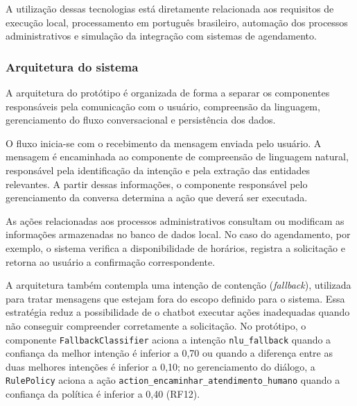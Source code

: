 \documentclass[12pt,a4paper]{extarticle}
\begin{document}
A utilização dessas tecnologias está diretamente relacionada aos requisitos de execução local, processamento em português brasileiro, automação dos processos administrativos e simulação da integração com sistemas de agendamento.

\subsubsection{Arquitetura do sistema}
\label{sec:arquitetura}

A arquitetura do protótipo é organizada de forma a separar os componentes responsáveis pela comunicação com o usuário, compreensão da linguagem, gerenciamento do fluxo conversacional e persistência dos dados.

O fluxo inicia-se com o recebimento da mensagem enviada pelo usuário. A mensagem é encaminhada ao componente de compreensão de linguagem natural, responsável pela identificação da intenção e pela extração das entidades relevantes. A partir dessas informações, o componente responsável pelo gerenciamento da conversa determina a ação que deverá ser executada.

As ações relacionadas aos processos administrativos consultam ou modificam as informações armazenadas no banco de dados local. No caso do agendamento, por exemplo, o sistema verifica a disponibilidade de horários, registra a solicitação e retorna ao usuário a confirmação correspondente.

A arquitetura também contempla uma intenção de contenção (\textit{fallback}), utilizada para tratar mensagens que estejam fora do escopo definido para o sistema. Essa estratégia reduz a possibilidade de o chatbot executar ações inadequadas quando não conseguir compreender corretamente a solicitação. No protótipo, o componente \texttt{FallbackClassifier} aciona a intenção \texttt{nlu\_\allowbreak{}fallback} quando a confiança da melhor intenção é inferior a 0,70 ou quando a diferença entre as duas melhores intenções é inferior a 0,10; no gerenciamento do diálogo, a \texttt{RulePolicy} aciona a ação \texttt{action\_\allowbreak{}encaminhar\_\allowbreak{}atendimento\_\allowbreak{}humano} quando a confiança da política é inferior a 0,40 (RF12).
\end{document}
